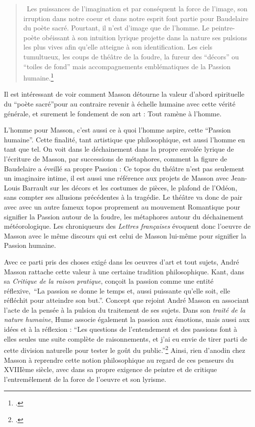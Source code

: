 \begin{quote}
 Les puissances de l’imagination et par conséquent la force de l’image, son irruption dans notre coeur et dans notre esprit font partie pour Baudelaire du poète sacré. Pourtant, il n’est d’image que de l’homme. Le peintre-poète obéissant à son intuition lyrique projette dans la nature ses pulsions les plus vives afin qu’elle atteigne à son identification. Les ciels tumultueux, les coups de théâtre de la foudre, la fureur des \enquote{décors} ou \enquote{toiles de fond} mais accompagnements emblématiques de la Passion humaine.\footcite{baudelairepeintres}\end{quote}
 
 Il est intéressant de voir comment Masson détourne la valeur d’abord spirituelle du \enquote{poète sacré}pour au contraire revenir à échelle humaine avec cette vérité générale, et surement le fondement de son art : Tout ramène à l’homme. 

	L’homme pour Masson, c’est aussi ce à quoi l’homme aspire, cette \enquote{Passion humaine}. Cette finalité, tant artistique que philosophique, est aussi l’homme en tant que tel. On voit dans le déchainement dans la propre envolée lyrique de l’écriture de Masson, par successions de métaphores, comment la figure de Baudelaire a éveillé sa propre Passion : Ce topos du théâtre n’est pas seulement un imaginaire intime, il est aussi une référence aux projets de Masson avec Jean-Louis Barrault sur les décors et les costumes de pièces, le plafond de l’Odéon, sans compter ses allusions précédentes à la tragédie. Le théâtre va donc de pair avec avec un autre fameux topos proprement au mouvement Romantique pour signifier la Passion autour de la foudre, les métaphores autour du déchainement météorologique. Les chroniqueurs des \emph{Lettres françaises} évoquent donc l’oeuvre de Masson avec le même discours qui est celui de Masson lui-même pour signifier la Passion humaine. 

Avec ce parti pris des choses exigé dans les oeuvres d’art et tout sujets, André Masson rattache cette valeur à une certaine tradition philosophique. Kant, dans sa \emph{Critique de la raison pratique}, conçoit la passion comme une entité réflexive, \enquote{La passion se donne le temps et, aussi puissante qu’elle soit, elle réfléchit pour atteindre son but.}. Concept que rejoint André Masson en associant l’acte de la pensée à la pulsion du traitement de ses sujets. Dans son \emph{traité de la nature humaine}, Hume associe également la passion aux émotions, mais aussi aux idées et à la réflexion : \enquote{Les questions de l'entendement et des passions font à elles seules une suite complète de raisonnements, et j'ai eu envie de tirer parti de cette division naturelle pour tester le goût du public.}\footcite{hume} Ainsi, rien d’anodin chez Masson à reprendre cette notion philosophique au regard de ces penseurs du XVIIIème siècle, avec dans sa propre exigence de peintre et de critique l’entremêlement de la force de l’oeuvre et son lyrisme. 


